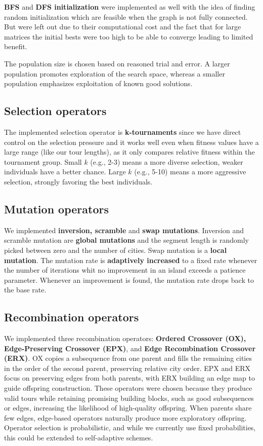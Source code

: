 \documentclass[a4paper,10pt]{article} %
\begin{document}
\noindent
\textbf{BFS} and \textbf{DFS initialization} were implemented as well with the idea of finding random initialization which are feasible when the graph is not fully connected. 
But were left out due to their computational cost and the fact that for large matrices the initial bests were too high to be able to converge leading to limited benefit. 

\noindent
The population size is chosen based on reasoned trial and error. A larger population promotes exploration of the search space, whereas a smaller population emphasizes exploitation of known good solutions.


\subsection{Selection operators}\label{sec_sel}
The implemented selection operator is \textbf{k-tournaments} since we have direct control on the selection pressure and it works well even when
fitness values have a large range (like our tour lengths), as it only compares relative fitness within the tournament
group. Small $k$ (e.g., 2-3) means a more diverse selection, weaker individuals have a better chance. Large $k$ (e.g.,
5-10) means a more aggressive selection, strongly favoring the best individuals.


\subsection{Mutation operators}\label{sec_mut}
We implemented \textbf{inversion, scramble} and \textbf{swap mutations}. 
Inversion and scramble mutation are \textbf{global mutations} and the segment length is randomly picked between zero and the number of cities.
Swap mutation is a \textbf{local mutation}.
The mutation rate is \textbf{adaptively increased} to a fixed rate whenever the number of iterations whit no improvement in an island exceeds a patience parameter. Whenever an improvement is found, the mutation rate drops back to the base rate.


\subsection{Recombination operators}\label{sec_cross}
We implemented three recombination operators: \textbf{Ordered Crossover (OX), Edge-Preserving Crossover (EPX)}, and \textbf{Edge Recombination Crossover (ERX)}. OX copies a subsequence from one parent and fills the remaining cities in the order of the second parent, preserving relative city order. EPX and ERX focus on preserving edges from both parents, with ERX building an edge map to guide offspring construction. These operators were chosen because they produce valid tours while retaining promising building blocks, such as good subsequences or edges, increasing the likelihood of high-quality offspring. When parents share few edges, edge-based operators naturally produce more exploratory offspring. Operator selection is probabilistic, and while we currently use fixed probabilities, this could be extended to self-adaptive schemes. 
\end{document}
